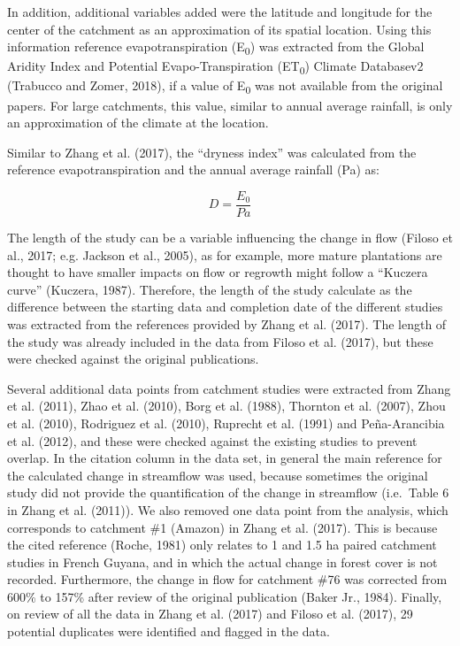 \documentclass[]{elsarticle} %
\begin{document}
In addition, additional variables added were the latitude and longitude for the center of the catchment as an approximation of its spatial location. Using this information reference evapotranspiration (E\textsubscript{0}) was extracted from the Global Aridity Index and Potential Evapo-Transpiration (ET\textsubscript{0}) Climate Databasev2 (Trabucco and Zomer, 2018), if a value of E\textsubscript{0} was not available from the original papers. For large catchments, this value, similar to annual average rainfall, is only an approximation of the climate at the location.

Similar to Zhang et al. (2017), the ``dryness index'' was calculated from the reference evapotranspiration and the annual average rainfall (Pa) as:

\begin{equation}
D = \frac{E_{0}}{Pa} \label{eq:eq1}
\end{equation}

The length of the study can be a variable influencing the change in flow (Filoso et al., 2017; e.g. Jackson et al., 2005), as for example, more mature plantations are thought to have smaller impacts on flow or regrowth might follow a ``Kuczera curve'' (Kuczera, 1987). Therefore, the length of the study calculate as the difference between the starting data and completion date of the different studies was extracted from the references provided by Zhang et al. (2017). The length of the study was already included in the data from Filoso et al. (2017), but these were checked against the original publications.

Several additional data points from catchment studies were extracted from Zhang et al. (2011), Zhao et al. (2010), Borg et al. (1988), Thornton et al. (2007), Zhou et al. (2010), Rodriguez et al. (2010), Ruprecht et al. (1991) and Peña-Arancibia et al. (2012), and these were checked against the existing studies to prevent overlap. In the citation column in the data set, in general the main reference for the calculated change in streamflow was used, because sometimes the original study did not provide the quantification of the change in streamflow (i.e.~Table 6 in Zhang et al. (2011)).
We also removed one data point from the analysis, which corresponds to catchment \#1 (Amazon) in Zhang et al. (2017). This is because the cited reference (Roche, 1981) only relates to 1 and 1.5 ha paired catchment studies in French Guyana, and in which the actual change in forest cover is not recorded. Furthermore, the change in flow for catchment \#76 was corrected from 600\% to 157\% after review of the original publication (Baker Jr., 1984). Finally, on review of all the data in Zhang et al. (2017) and Filoso et al. (2017), 29 potential duplicates were identified and flagged in the data.
\end{document}
